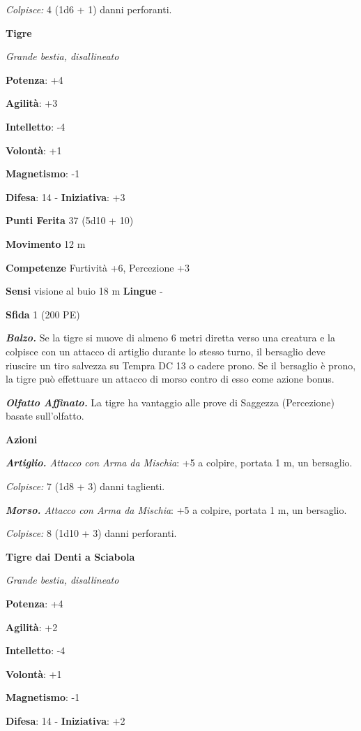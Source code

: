 \begin{multicols}{2}
\emph{Colpisce:} 4 (1d6 + 1) danni perforanti.

\textbf{Tigre}

\emph{Grande bestia, disallineato}

\textbf{Potenza}: +4

\textbf{Agilità}: +3

\textbf{Intelletto}: -4

\textbf{Volontà}: +1

\textbf{Magnetismo}: -1

\textbf{Difesa}: 14 - \textbf{Iniziativa}: +3

\textbf{Punti Ferita} 37 (5d10 + 10)

\textbf{Movimento} 12 m

\textbf{Competenze} Furtività +6, Percezione +3

\textbf{Sensi} visione al buio 18 m
\textbf{Lingue} -

\textbf{Sfida} 1 (200 PE)\smallskip

\emph{\textbf{Balzo.}} Se la tigre si muove di almeno 6 metri diretta
verso una creatura e la colpisce con un attacco di artiglio durante lo
stesso turno, il bersaglio deve riuscire un tiro salvezza su Tempra DC 13
o cadere prono. Se il bersaglio è prono, la tigre può effettuare un
attacco di morso contro di esso come azione bonus.

\emph{\textbf{Olfatto Affinato.}} La tigre ha vantaggio alle prove di
Saggezza (Percezione) basate sull'olfatto.

\smallskip\textbf{Azioni}

\emph{\textbf{Artiglio.} Attacco con Arma da Mischia}: +5 a colpire,
portata 1 m, un bersaglio.

\emph{Colpisce:} 7 (1d8 + 3) danni taglienti.

\emph{\textbf{Morso.} Attacco con Arma da Mischia}: +5 a colpire,
portata 1 m, un bersaglio.

\emph{Colpisce:} 8 (1d10 + 3) danni perforanti.

\textbf{Tigre dai Denti a Sciabola}

\emph{Grande bestia, disallineato}

\textbf{Potenza}: +4

\textbf{Agilità}: +2

\textbf{Intelletto}: -4

\textbf{Volontà}: +1

\textbf{Magnetismo}: -1

\textbf{Difesa}: 14 - \textbf{Iniziativa}: +2


\end{multicols}
